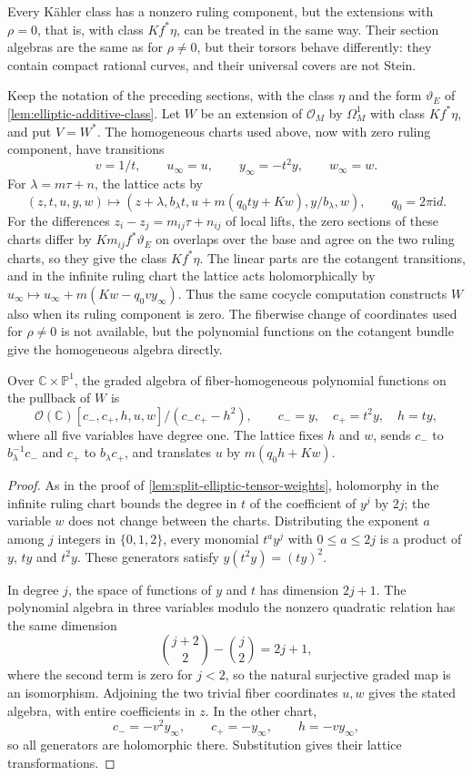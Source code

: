 Every K\"ahler class has a nonzero ruling component, but the extensions with $\rho=0$, that is, with class $Kf^*\eta$, can be treated in the same way. Their section algebras are the same as for $\rho\neq0$, but their torsors behave differently: they contain compact rational curves, and their universal covers are not Stein.

Keep the notation of the preceding sections, with the class $\eta$ and the form $\vartheta_E$ of \cref{lem:elliptic-additive-class}. Let $W$ be an extension of $\mathcal O_M$ by $\Omega_M^1$ with class $Kf^*\eta$, and put $V=W^*$. The homogeneous charts used above, now with zero ruling component, have transitions
\[
 v=1/t,\qquad u_\infty=u,\qquad
 y_\infty=-t^2y,\qquad w_\infty=w.
\]
For $\lambda=m\tau+n$, the lattice acts by
\[
 (z,t,u,y,w)\longmapsto
 (z+\lambda,b_\lambda t,u+m(q_0ty+Kw),y/b_\lambda,w),
 \qquad q_0=2\pi\mathrm{i}d.
\]
For the differences $z_i-z_j=m_{ij}\tau+n_{ij}$ of local lifts, the zero sections of these charts differ by $Km_{ij}f^*\vartheta_E$ on overlaps over the base and agree on the two ruling charts, so they give the class $Kf^*\eta$. The linear parts are the cotangent transitions, and in the infinite ruling chart the lattice acts holomorphically by $u_\infty\mapsto u_\infty+m(Kw-q_0v y_\infty)$. Thus the same cocycle computation constructs $W$ also when its ruling component is zero. The fiberwise change of coordinates used for $\rho\ne0$ is not available, but the polynomial functions on the cotangent bundle give the homogeneous algebra directly.

\begin{lemma}\label{lem:elliptic-zero-ruling-quadric}
Over $\mathbb C\times\mathbb P^1$, the graded algebra of fiber-homogeneous polynomial functions on the pullback of $W$ is
\[
 \mathcal O(\mathbb C)[c_-,c_+,h,u,w]/(c_-c_+-h^2),
 \qquad c_-=y,\quad c_+=t^2y,\quad h=ty,
\]
where all five variables have degree one. The lattice fixes $h$ and $w$, sends $c_-$ to $b_\lambda^{-1}c_-$ and $c_+$ to $b_\lambda c_+$, and translates $u$ by $m(q_0h+Kw)$.
\end{lemma}
\begin{proof}
As in the proof of \cref{lem:split-elliptic-tensor-weights}, holomorphy in the infinite ruling chart bounds the degree in $t$ of the coefficient of $y^j$ by $2j$; the variable $w$ does not change between the charts. Distributing the exponent $a$ among $j$ integers in $\{0,1,2\}$, every monomial $t^ay^j$ with $0\leq a\leq2j$ is a product of $y$, $ty$ and $t^2y$. These generators satisfy $y(t^2y)=(ty)^2$.

In degree $j$, the space of functions of $y$ and $t$ has dimension $2j+1$. The polynomial algebra in three variables modulo the nonzero quadratic relation has the same dimension
\[
 \binom{j+2}{2}-\binom{j}{2}=2j+1,
\]
where the second term is zero for $j<2$, so the natural surjective graded map is an isomorphism. Adjoining the two trivial fiber coordinates $u,w$ gives the stated algebra, with entire coefficients in $z$. In the other chart,
\[
 c_-=-v^2y_\infty,\qquad c_+=-y_\infty,
 \qquad h=-v y_\infty,
\]
so all generators are holomorphic there. Substitution gives their lattice transformations.
\end{proof}

